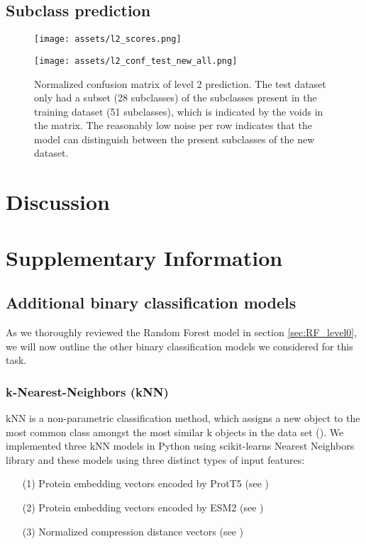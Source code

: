 \documentclass{bioinfo}
\begin{document}
\lipsum[1]

\subsection{Subclass prediction}
\lipsum[1]

\begin{figure}[!b]
\texttt{[image: assets/l2\_scores.png]}
\caption{}\label{fig:FNN_scores_l2}
\end{figure}
\lipsum[1]
\begin{figure}[!htb]
\texttt{[image: assets/l2\_conf\_test\_new\_all.png]}
\caption{Normalized confusion matrix of level 2 prediction.
The test dataset only had a subset (28 subclasses) of the subclasses present in the training dataset (51 subclasses),
which is indicated by the voids in the matrix.
The reasonably low noise per row indicates that the model can distinguish between the present subclasses of the new dataset.}\label{fig:FNN_conf_l2}
\end{figure}
\lipsum[1]

\section{Discussion}
\lipsum[1]

\section{Supplementary Information}

\subsection{Additional binary classification models}\label{sec:unused binarys}
As we thoroughly reviewed the Random Forest model in section \ref{sec:RF_level0}, we will now outline the other binary classification models we considered for this task.

\subsubsection{k-Nearest-Neighbors (kNN)}
kNN is a non-parametric classification method,
which assigns a new object to the most common class amongst the most similar k objects in the data set (\cite{knn_principles}). We implemented three kNN models in Python using scikit-learns Nearest Neighbors library and 
these models using three distinct types of input features:
\begin{enumerate}
	\item[(1)] Protein embedding vectors encoded by ProtT5 (see \cite{ProtT5})
    \item[(2)] Protein embedding vectors encoded by ESM2 (see \cite{ESM2})
    \item[(3)] Normalized compression distance vectors (see \cite{GzipTextClassification})
\end{enumerate}
\end{document}
